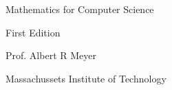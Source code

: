 \begin{center}
\begin{minipage}{4.5in}
\begin{center}
\rule{0in}{2in}
{\huge Mathematics for Computer Science}


\vspace{0.5in}
{\huge First Edition}

\Stamp

\vspace{1in}
{\LARGE Prof. Albert R Meyer}

{\large Massachussets Institute of Technology}

\end{center}

\end{minipage}
\end{center}
\coursecopyright